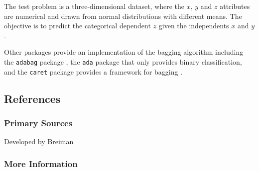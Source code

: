 The test problem is a three-dimensional dataset, where the $x$, $y$ and $z$ attributes are numerical and drawn from normal distributions with different means. The objective is to predict the categorical dependent $z$ given the independents $x$ and $y$.



Other packages provide an implementation of the bagging algorithm including the \texttt{adabag} package \cite{Cortes2011}, the \texttt{ada} package that only provides binary classification, and the \texttt{caret} package provides a framework for bagging \cite{Kuhn2011}.

\subsection{References}

\subsubsection{Primary Sources}

Developed by Breiman \cite{Breiman1996}

\subsubsection{More Information}



